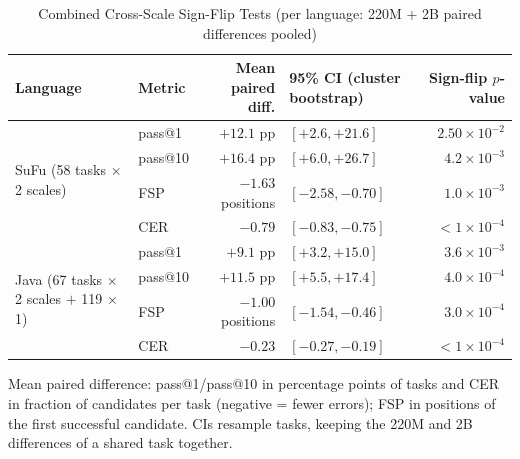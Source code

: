 \begin{table}[ht]
\centering
\small
\begin{threeparttable}
\caption{Combined Cross-Scale Sign-Flip Tests (per language: 220M + 2B paired differences pooled)}
\label{tab:paired-statistics-combined}
\begin{tabular}{l l r l r}
\toprule
Language & Metric & Mean paired diff. & 95\% CI (cluster bootstrap) & Sign-flip $p$-value \\
\midrule
\multirow{4}{*}{SuFu (58 tasks $\times$ 2 scales)}
 & pass@1 & $+12.1$ pp & $[+2.6, +21.6]$ & $2.50{\times}10^{-2}$ \\
 & pass@10 & $+16.4$ pp & $[+6.0, +26.7]$ & $4.2{\times}10^{-3}$ \\
 & FSP & $-1.63$ positions & $[-2.58, -0.70]$ & $1.0{\times}10^{-3}$ \\
 & CER & $-0.79$ & $[-0.83, -0.75]$ & $<1{\times}10^{-4}$ \\
\midrule
\multirow{4}{*}{Java (67 tasks $\times$ 2 scales $+$ 119 $\times$ 1)}
 & pass@1 & $+9.1$ pp & $[+3.2, +15.0]$ & $3.6{\times}10^{-3}$ \\
 & pass@10 & $+11.5$ pp & $[+5.5, +17.4]$ & $4.0{\times}10^{-4}$ \\
 & FSP & $-1.00$ positions & $[-1.54, -0.46]$ & $3.0{\times}10^{-4}$ \\
 & CER & $-0.23$ & $[-0.27, -0.19]$ & $<1{\times}10^{-4}$ \\
\bottomrule
\end{tabular}
\begin{tablenotes}
\footnotesize
\item Mean paired difference: pass@1/pass@10 in percentage points of tasks and CER in fraction of candidates per task (negative = fewer errors); FSP in positions of the first successful candidate. CIs resample tasks, keeping the 220M and 2B differences of a shared task together.
\end{tablenotes}
\end{threeparttable}
\end{table}
